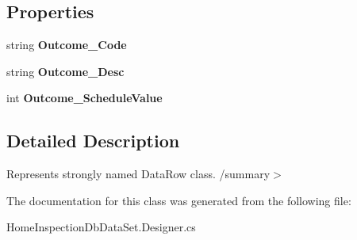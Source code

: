 \subsection*{Properties}
\begin{DoxyCompactItemize}
\item 
\mbox{\label{class_a_f_h___scheduler_1_1_home_inspection_db_data_set_1_1_inspection___outcomes_row_a9abf24a1437197b199ddbcc19a97757a}} 
string {\bfseries Outcome\+\_\+\+Code}\hspace{0.3cm}{\ttfamily  [get, set]}
\item 
\mbox{\label{class_a_f_h___scheduler_1_1_home_inspection_db_data_set_1_1_inspection___outcomes_row_a1c0f8aa2cd67fd939f9cabed182e91eb}} 
string {\bfseries Outcome\+\_\+\+Desc}\hspace{0.3cm}{\ttfamily  [get, set]}
\item 
\mbox{\label{class_a_f_h___scheduler_1_1_home_inspection_db_data_set_1_1_inspection___outcomes_row_a7fd2b9518d7f3252f26ecf6dea382525}} 
int {\bfseries Outcome\+\_\+\+Schedule\+Value}\hspace{0.3cm}{\ttfamily  [get, set]}
\end{DoxyCompactItemize}


\subsection{Detailed Description}
Represents strongly named Data\+Row class. /summary$>$ 

The documentation for this class was generated from the following file\+:\begin{DoxyCompactItemize}
\item 
Home\+Inspection\+Db\+Data\+Set.\+Designer.\+cs\end{DoxyCompactItemize}
